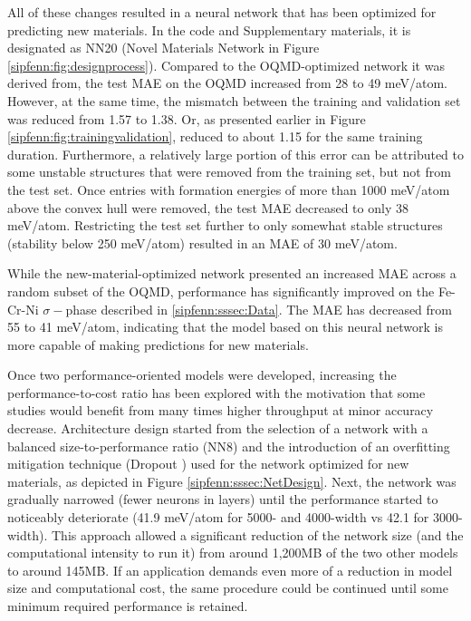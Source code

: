 All of these changes resulted in a neural network that has been optimized for predicting new materials. In the code and Supplementary materials, it is designated as NN20 (Novel Materials Network in Figure \ref{sipfenn:fig:designprocess}). Compared to the OQMD-optimized network it was derived from, the test MAE on the OQMD increased from 28 to 49 meV/atom. However, at the same time, the mismatch between the training and validation set was reduced from 1.57 to 1.38. Or, as presented earlier in Figure \ref{sipfenn:fig:trainingvalidation}, reduced to about 1.15 for the same training duration. Furthermore, a relatively large portion of this error can be attributed to some unstable structures that were removed from the training set, but not from the test set. Once entries with formation energies of more than 1000 meV/atom above the convex hull were removed, the test MAE decreased to only 38 meV/atom. Restricting the test set further to only somewhat stable structures (stability below 250 meV/atom) resulted in an MAE of 30 meV/atom.

While the new-material-optimized network presented an increased MAE across a random subset of the OQMD, performance has significantly improved on the Fe-Cr-Ni $\sigma-$phase described in \ref{sipfenn:sssec:Data}. The MAE has decreased from 55 to 41 meV/atom, indicating that the model based on this neural network is more capable of making predictions for new materials.

Once two performance-oriented models were developed, increasing the performance-to-cost ratio has been explored with the motivation that some studies would benefit from many times higher throughput at minor accuracy decrease. Architecture design started from the selection of a network with a balanced size-to-performance ratio (NN8) and the introduction of an overfitting mitigation technique (Dropout \cite{srivastava2014dropout}) used for the network optimized for new materials, as depicted in Figure \ref{sipfenn:sssec:NetDesign}. Next, the network was gradually narrowed (fewer neurons in layers) until the performance started to noticeably deteriorate (41.9 meV/atom for 5000- and 4000-width vs 42.1 for 3000-width). This approach allowed a significant reduction of the network size (and the computational intensity to run it) from around 1,200MB of the two other models to around 145MB. If an application demands even more of a reduction in model size and computational cost, the same procedure could be continued until some minimum required performance is retained. 


